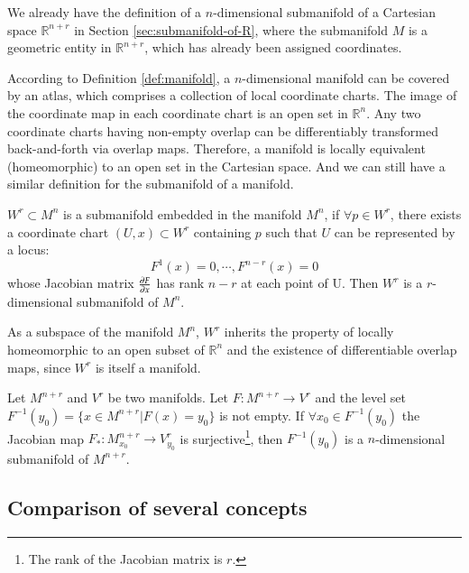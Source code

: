 \documentclass[11pt, a4paper]{book}
\begin{document}
We already have the definition of a $n$-dimensional submanifold of a Cartesian space
$\mathbb{R}^{n+r}$ in Section \ref{sec:submanifold-of-R}, where the submanifold $M$ is a
geometric entity in $\mathbb{R}^{n+r}$, which has already been assigned coordinates.

According to Definition \ref{def:manifold}, a $n$-dimensional manifold can be covered by
an atlas, which comprises a collection of local coordinate charts. The image of the
coordinate map in each coordinate chart is an open set in $\mathbb{R}^{n}$. Any two
coordinate charts having non-empty overlap can be differentiably transformed
back-and-forth via overlap maps. Therefore, a manifold is locally equivalent
(homeomorphic) to an open set in the Cartesian space. And we can still have a similar
definition for the submanifold of a manifold.

\begin{Definition}
  $W^r \subset M^n$ is a submanifold embedded in the manifold $M^n$, if
  $\forall p \in W^r$, there exists a coordinate chart $(U, x) \subset W^r$ containing $p$
  such that $U$ can be represented by a locus:
  $$
  F^1(x) = 0, \cdots, F^{n-r}(x) = 0
  $$
  whose Jacobian matrix $\frac{\partial F}{\partial x}$ has rank $n-r$ at each point of U.
  Then $W^r$ is a $r$-dimensional submanifold of $M^n$.
\end{Definition}

\begin{Remark}
  As a subspace of the manifold $M^n$, $W^r$ inherits the property of locally homeomorphic
  to an open subset of $\mathbb{R}^n$ and the existence of differentiable overlap maps,
  since $W^r$ is itself a manifold.
\end{Remark}

\begin{Theorem}
  Let $M^{n+r}$ and $V^r$ be two manifolds. Let $F: M^{n+r} \rightarrow V^r$ and the level
  set $F^{-1}(y_0) = \{x \in M^{n+r} \vert F(x) = y_0\}$ is not empty. If
  $\forall x_0 \in F^{-1}(y_0)$ the Jacobian map
  $F_{*}: M_{x_0}^{n+r} \rightarrow V_{y_0}^r$ is surjective\footnote{The rank of the
    Jacobian matrix is $r$.}, then $F^{-1}(y_0)$ is a $n$-dimensional submanifold of
  $M^{n+r}$.
\end{Theorem}

\subsection{Comparison of several concepts}
\end{document}
